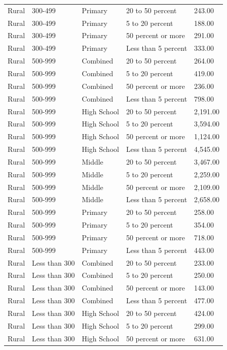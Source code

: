 \documentclass[man]{apa6}
\begin{document}
\begin{table}[tbp]
\begin{center}
\begin{threeparttable}
\begin{tabular}{lllll}
Rural & 300-499 & Primary & 20 to 50 percent & 243.00\\
Rural & 300-499 & Primary & 5 to 20 percent & 188.00\\
Rural & 300-499 & Primary & 50 percent or more & 291.00\\
Rural & 300-499 & Primary & Less than 5 percent & 333.00\\
Rural & 500-999 & Combined & 20 to 50 percent & 264.00\\
Rural & 500-999 & Combined & 5 to 20 percent & 419.00\\
Rural & 500-999 & Combined & 50 percent or more & 236.00\\
Rural & 500-999 & Combined & Less than 5 percent & 798.00\\
Rural & 500-999 & High School & 20 to 50 percent & 2,191.00\\
Rural & 500-999 & High School & 5 to 20 percent & 3,594.00\\
Rural & 500-999 & High School & 50 percent or more & 1,124.00\\
Rural & 500-999 & High School & Less than 5 percent & 4,545.00\\
Rural & 500-999 & Middle & 20 to 50 percent & 3,467.00\\
Rural & 500-999 & Middle & 5 to 20 percent & 2,259.00\\
Rural & 500-999 & Middle & 50 percent or more & 2,109.00\\
Rural & 500-999 & Middle & Less than 5 percent & 2,658.00\\
Rural & 500-999 & Primary & 20 to 50 percent & 258.00\\
Rural & 500-999 & Primary & 5 to 20 percent & 354.00\\
Rural & 500-999 & Primary & 50 percent or more & 718.00\\
Rural & 500-999 & Primary & Less than 5 percent & 443.00\\
Rural & Less than 300 & Combined & 20 to 50 percent & 233.00\\
Rural & Less than 300 & Combined & 5 to 20 percent & 250.00\\
Rural & Less than 300 & Combined & 50 percent or more & 143.00\\
Rural & Less than 300 & Combined & Less than 5 percent & 477.00\\
Rural & Less than 300 & High School & 20 to 50 percent & 424.00\\
Rural & Less than 300 & High School & 5 to 20 percent & 299.00\\
Rural & Less than 300 & High School & 50 percent or more & 631.00\\

\end{tabular}
\end{threeparttable}
\end{center}
\end{table}
\end{document}

